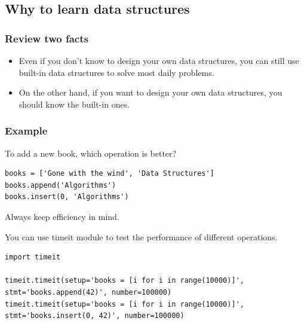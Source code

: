 \documentclass[aspectratio=169, 14pt]{beamer}
\begin{document}
{
\begin{frame}
	\section{\textcolor{darkmidnightblue}{Why to learn data structures}}
\end{frame}
}

\begin{frame}[fragile]
	\frametitle{Review two facts}
	\begin{itemize}
		\item Even if you don't know to design your own data structures, you can still use built-in data structures to solve most daily problems.
		\item On the other hand, if you want to design your own data structures, you should know the built-in ones.
	\end{itemize}

\end{frame}

\begin{frame}[fragile]
	\frametitle{Example}
	To add a new book, which operation is better?
	\begin{verbatim}
books = ['Gone with the wind', 'Data Structures']
books.append('Algorithms')
books.insert(0, 'Algorithms')
    \end{verbatim}

	Always keep \alert{efficiency} in mind.
\end{frame}

\begin{frame}[fragile]

	You can use \alert{timeit} module to test the performance of different operations.
	\begin{verbatim}
import timeit

timeit.timeit(setup='books = [i for i in range(10000)]', stmt='books.append(42)', number=100000)
timeit.timeit(setup='books = [i for i in range(10000)]', stmt='books.insert(0, 42)', number=100000)
    \end{verbatim}
\end{frame}
\end{document}
